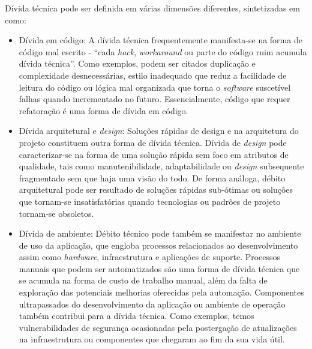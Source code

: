 Dívida técnica pode ser definida em várias dimensões diferentes, sintetizadas em \cite{tom2013exploration} como:
\begin{itemize}
	\item Dívida em código: A dívida técnica frequentemente manifesta-se na forma de código mal escrito - ``cada \textit{hack}, \textit{workaround} ou parte do código ruim acumula dívida técnica''\cite{stopford2010}. Como exemplos, podem ser citados duplicação e complexidade desnecessárias, estilo inadequado que reduz a facilidade de leitura do código ou lógica mal organizada que torna o \textit{software} suscetível falhas quando incrementado no futuro. Essencialmente, código que requer refatoração é uma forma de dívida em código.
	
	\item Dívida arquitetural e \textit{design}: Soluções rápidas de design e na arquitetura do projeto constituem outra forma de dívida técnica. Dívida de \textit{design} pode caracterizar-se na forma de uma solução rápida sem foco em atributos de qualidade, tais como manutenibilidade, adaptabilidade ou \textit{design} subsequente fragmentado sem que haja uma visão do todo\cite{shriver2010}. De forma análoga, débito arquitetural pode ser resultado de soluções rápidas sub-ótimas ou soluções que tornam-se insatisfatórias quando tecnologias ou padrões de projeto tornam-se obsoletos.
	
	\item Dívida de ambiente: Débito técnico pode também se manifestar no ambiente de uso da aplicação, que engloba processos relacionados ao desenvolvimento assim como \textit{hardware}, infraestrutura e aplicações de suporte. Processos manuais que podem ser automatizados são uma forma de dívida técnica que se acumula na forma de custo de trabalho manual, além da falta de exploração das potenciais melhorias oferecidas pela automação. Componentes ultrapassados do desenvolvimento da aplicação ou ambiente de operação também contribui para a dívida técnica. Como exemplos, temos vulnerabilidades de segurança ocasionadas pela postergação de atualizações na infraestrutura ou componentes que chegaram ao fim da sua vida útil.
	

\end{itemize}
